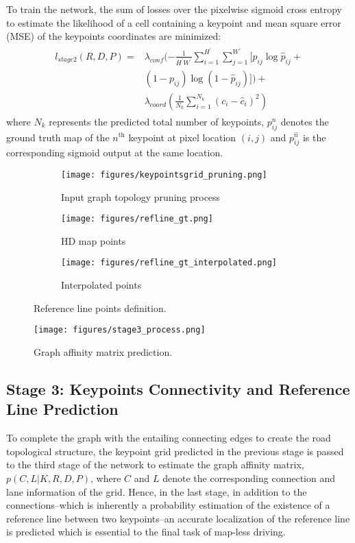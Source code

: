 \documentclass[10pt,twocolumn,letterpaper]{article}
\begin{document}
To train the network, the sum of losses over the pixelwise sigmoid cross entropy to estimate the likelihood of a cell containing a keypoint and mean square error (MSE) of the keypoints coordinates are minimized:
\begin{align}
\begin{split}
  l_{stage2} (R, D, P) = & \lambda_{conf}(-\frac{1}{H^\prime W^\prime}\sum_{i=1}^{H^\prime} \sum_{j=1}^{W^\prime}[p_{ij} \log \hat{p}_{ij} + \\
  & (1-p_{ij}) \log (1-\hat{p}_{ij})]) 
                          + \\ & \lambda_{coord}(\frac{1}{N_k}\sum_{i=1}^{N_k} (c_i-\hat{c}_i)^2) \; 
\end{split}
\end{align}
where $N_k$ represents the predicted total number of keypoints, $p_{ij}^n$ denotes the ground truth map of the $n^{\text{th}}$ keypoint at pixel location $(i, j)$ and $p_{ij}^{\hat{n}}$ is the corresponding sigmoid output at the same location.
\begin{figure}
     \centering
     \begin{subfigure}[b]{0.97\linewidth}
         \centering
         \texttt{[image: figures/keypointsgrid\_pruning.png]}
         \caption{Input graph topology pruning process}
         \label{fig:keypointsgrid_pruning}
     \end{subfigure}
     \begin{subfigure}[b]{0.48\linewidth}
         \centering
         \texttt{[image: figures/refline\_gt.png]}
         \caption{HD map points}
         \label{fig:refline_points_map}
     \end{subfigure}
     \begin{subfigure}[b]{0.48\linewidth}
         \centering
         \texttt{[image: figures/refline\_gt\_interpolated.png]}
         \caption{Interpolated points}
         \label{fig:refline_points_gt}
     \end{subfigure}
     \caption{Reference line points definition.}
     \label{fig:refline_gt_preparation}
\end{figure}
\begin{figure*}
     \centering
     \texttt{[image: figures/stage3\_process.png]}
     \caption{Graph affinity matrix prediction.}
     \label{fig:stage3_process}
\end{figure*}
\subsection{Stage 3: Keypoints Connectivity and Reference Line Prediction}
To complete the graph with the entailing connecting edges to create the road topological structure, the keypoint grid predicted in the previous stage is passed to the third stage of the network to estimate the graph affinity matrix, $p(C, L | K, R, D, P)$, where $C$ and $L$ denote the corresponding connection and lane information of the grid. Hence, in the last stage, in addition to the connections--which is inherently a probability estimation of the existence of a reference line between two keypoints--an accurate localization of the reference line is predicted which is essential to the final task of map-less driving.
\end{document}
